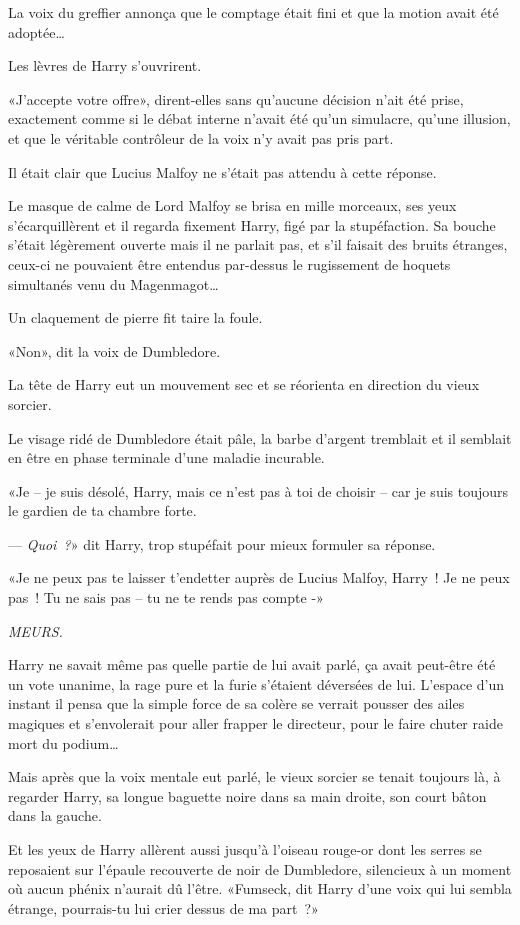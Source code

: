 La voix du greffier annonça que le comptage était fini et que la motion avait été adoptée…

Les lèvres de Harry s'ouvrirent.

«J'accepte votre offre», dirent-elles sans qu'aucune décision n'ait été prise, exactement comme si le débat interne n'avait été qu'un simulacre, qu'une illusion, et que le véritable contrôleur de la voix n'y avait pas pris part.

Il était clair que Lucius Malfoy ne s'était pas attendu à cette réponse.

Le masque de calme de Lord Malfoy se brisa en mille morceaux, ses yeux s'écarquillèrent et il regarda fixement Harry, figé par la stupéfaction. Sa bouche s'était légèrement ouverte mais il ne parlait pas, et s'il faisait des bruits étranges, ceux-ci ne pouvaient être entendus par-dessus le rugissement de hoquets simultanés venu du Magenmagot…

Un claquement de pierre fit taire la foule.

«Non», dit la voix de Dumbledore.

La tête de Harry eut un mouvement sec et se réorienta en direction du vieux sorcier.

Le visage ridé de Dumbledore était pâle, la barbe d'argent tremblait et il semblait en être en phase terminale d'une maladie incurable.

«Je -- je suis désolé, Harry, mais ce n'est pas à toi de choisir -- car je suis toujours le gardien de ta chambre forte.

--- \emph{Quoi~?}» dit Harry, trop stupéfait pour mieux formuler sa réponse.

«Je ne peux pas te laisser t'endetter auprès de Lucius Malfoy, Harry~! Je ne peux pas~! Tu ne sais pas -- tu ne te rends pas compte -»

\emph{MEURS.}

Harry ne savait même pas quelle partie de lui avait parlé, ça avait peut-être été un vote unanime, la rage pure et la furie s'étaient déversées de lui. L'espace d'un instant il pensa que la simple force de sa colère se verrait pousser des ailes magiques et s'envolerait pour aller frapper le directeur, pour le faire chuter raide mort du podium…

Mais après que la voix mentale eut parlé, le vieux sorcier se tenait toujours là, à regarder Harry, sa longue baguette noire dans sa main droite, son court bâton dans la gauche.

Et les yeux de Harry allèrent aussi jusqu'à l'oiseau rouge-or dont les serres se reposaient sur l'épaule recouverte de noir de Dumbledore, silencieux à un moment où aucun phénix n'aurait dû l'être. «Fumseck, dit Harry d'une voix qui lui sembla étrange, pourrais-tu lui crier dessus de ma part~?»

